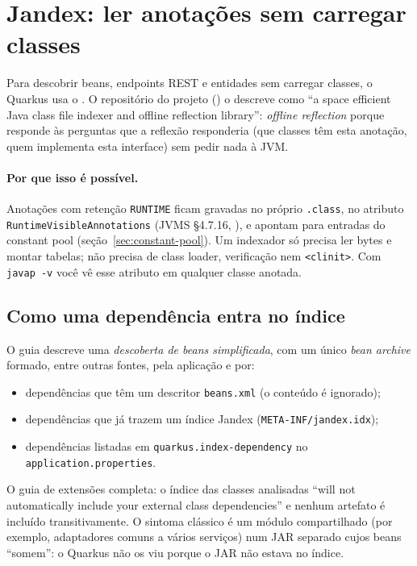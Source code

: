 \section{Jandex: ler anotações sem carregar classes}
\label{sec:jandex}

Para descobrir beans, endpoints REST e entidades sem carregar classes, o
Quarkus usa o . O repositório do projeto
() o descreve como \enquote{a space efficient Java
class file indexer and offline reflection library}: \emph{offline
reflection} porque responde às perguntas que a reflexão responderia
(que classes têm esta anotação, quem implementa esta interface) sem
pedir nada à JVM.

\paragraph{Por que isso é possível.}
Anotações com retenção \texttt{RUNTIME} ficam gravadas no próprio
\texttt{.class}, no atributo \texttt{RuntimeVisibleAnnotations} (JVMS
§4.7.16, ), e apontam para entradas do constant
pool (seção~\ref{sec:constant-pool}). Um indexador só precisa ler bytes
e montar tabelas; não precisa de class loader, verificação nem
\texttt{<clinit>}. Com \texttt{javap -v} você vê esse atributo em
qualquer classe anotada.

\subsection*{Como uma dependência entra no índice}

O guia  descreve uma
\emph{descoberta de beans simplificada}, com um único \emph{bean archive}
formado, entre outras fontes, pela aplicação e por:
\begin{itemize}
\item dependências que têm um descritor \texttt{beans.xml} (o conteúdo é
  ignorado);
\item dependências que já trazem um índice Jandex
  (\texttt{META-INF/jandex.idx});
\item dependências listadas em \texttt{quarkus.index-dependency} no
  \texttt{application.properties}.
\end{itemize}

O guia de extensões completa: o índice das classes analisadas
\enquote{will not automatically include your external class dependencies}
e nenhum artefato é incluído transitivamente. O sintoma clássico é um
módulo compartilhado (por exemplo, adaptadores comuns a vários serviços)
num JAR separado cujos beans \enquote{somem}: o Quarkus não os viu porque
o JAR não estava no índice.

